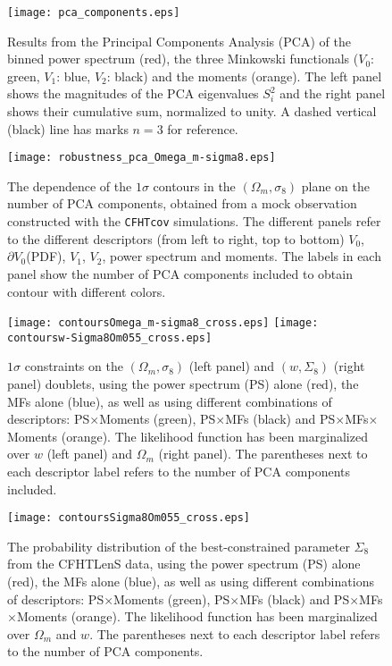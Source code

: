 \documentclass[reprint,aps,prd,superscriptaddress,showkeys,showpacs]{revtex4-1}
\begin{document}
\begin{figure*}
\texttt{[image: pca\_components.eps]}
\caption{Results from the Principal Components Analysis (PCA) of the
  binned power spectrum (red), the three Minkowski functionals ($V_0$:
  green, $V_1$: blue, $V_2$: black) and the moments (orange).
  The left panel shows the magnitudes of the PCA eigenvalues $S_i^2$
  and the right panel shows their cumulative sum, normalized to
  unity. A dashed vertical (black) line has marks $n=3$ for
  reference.}
\label{pcafig}
\end{figure*}
\begin{figure*}
\texttt{[image: robustness\_pca\_Omega\_m-sigma8.eps]}
\caption{The dependence of the $1\sigma$ contours in the
  $(\Omega_m,\sigma_8)$ plane on the number of PCA components,
  obtained from a mock observation constructed with the
  \texttt{CFHTcov} simulations. The different panels refer to the
  different descriptors (from left to right, top to bottom) $V_0$,
  $\partial V_0$(PDF), $V_1$, $V_2$, power spectrum and moments.  The
  labels in each panel show the number of PCA components included to
  obtain contour with different colors.}
\label{robustnessfig}
\end{figure*}




\begin{figure*}
\begin{center}
\texttt{[image: contoursOmega\_m-sigma8\_cross.eps]}
\texttt{[image: contoursw-Sigma8Om055\_cross.eps]}
\end{center}
\caption{$1\sigma$ constraints on the $(\Omega_m,\sigma_8)$ (left
  panel) and $(w,\Sigma_8)$ (right panel) doublets, using the power
  spectrum (PS) alone (red), the MFs alone (blue), as well as using
  different combinations of descriptors: PS$\times$Moments (green),
  PS$\times$MFs (black) and PS$\times$MFs$\times$Moments (orange). The
  likelihood function has been marginalized over $w$ (left panel) and
  $\Omega_m$ (right panel). The parentheses next to each descriptor
  label refers to the number of PCA components included.}
\label{contours3combined}
\end{figure*}

\begin{figure}
\begin{center}
\texttt{[image: contoursSigma8Om055\_cross.eps]}
\end{center}
\caption{The probability distribution of the best-constrained
  parameter $\Sigma_8$ from the CFHTLenS data, using the power
  spectrum (PS) alone (red), the MFs alone (blue), as well as using
  different combinations of descriptors: PS$\times$Moments (green),
  PS$\times$MFs (black) and PS$\times$MFs$\times$Moments (orange).
  The likelihood function has been marginalized over $\Omega_m$ and
  $w$. The parentheses next to each descriptor label refers to the
  number of PCA components.}
\label{likelihoodSi8cross}
\end{figure}
\end{document}
